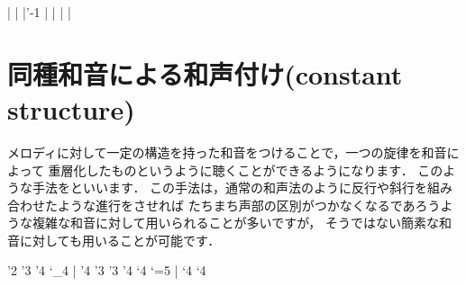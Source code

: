 \documentclass[dvipdfmx,uplatex,b5paper,openany,jbase=12Q,nomag*,textwidth-limit=44%
               ]{gachimuchi}
\begin{document}
\begin{Music}
  \Startpiece%
  \NOtes
  \sk%
  |%
  \en\bar
  \NOtes
  |\rq{-1}%
  \en\bar
  \NOtes
  |%
  \en\bar
  \NOtes
  \sk
  |%
  \en\setdoublebar
  \endpiece%
\end{Music}

\section{同種和音による和声付け(constant structure)}
メロディに対して一定の構造を持った和音をつけることで，一つの旋律を和音によって
重層化したものというように聴くことができるようになります．
このような手法をといいます．
この手法は，通常の和声法のように反行や斜行を組み合わせたような進行をさせれば
たちまち声部の区別がつかなくなるであろうような複雑な和音に対して用いられることが多いですが，
そうではない簡素な和音に対しても用いることが可能です．

\begin{Music}
  \nostartrule%
  \generalmeter{\meterC}%
  \Startpiece%
  \NOtes{}%
  \rq{2}%
  \rq{3}%
  \rq{4}%
  \lq{_4}%
  \en\bar
  \NOtes
  \rq{4}%
  \rq{3}%
  \en\NOTes
  \en\doublebar
  \NOtes{}%
  \rq{3}%
  \rq{4}%
  \lq{4}%
  \lq{=5}%
  \en\bar
  \NOtes
  \lq{4}%
  \lq{4}%
  \en\NOTes
  \en\setdoublebar
  \endpiece%
\end{Music}
\end{document}
